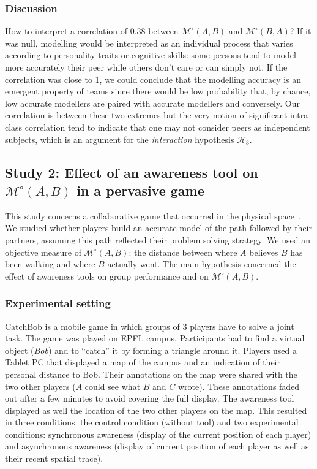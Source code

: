 \documentclass[natbib]{svjour3}
\newcommand{\gModel}[2]{{$\mathcal{M}^{\circ}(#1, #2)$}}
\begin{document}
\subsubsection*{Discussion}

How to interpret a correlation of 0.38 between \gModel{A}{B} and \gModel{B}{A}?
If it was null, modelling would be interpreted as an individual process that
varies according to personality traits or cognitive skills: some persons tend to
model more accurately their peer while others don't care or can simply not. If
the correlation was close to 1, we could conclude that the modelling accuracy is
an emergent property of teams since there would be low probability that, by
chance, low accurate modellers are paired with accurate modellers and
conversely. Our correlation is between these two extremes but the very notion of
significant intra-class correlation tend to indicate that one may not consider
peers as independent subjects, which is an argument for the \emph{interaction}
hypothesis $\mathcal{H}_{3}$. 


\subsection{Study 2: Effect of an awareness tool on \gModel{A}{B}  in a pervasive
game}

This study concerns a collaborative game that occurred in the physical
space~\citep{nova2006underwhelming}. We studied whether players build an accurate
model of the path followed by their partners, assuming this path reflected their
problem solving strategy. We used an objective measure of \gModel{A}{B}: the
distance between where $A$ believes $B$ has been walking and where $B$ actually went.
The main hypothesis concerned the effect of awareness tools on group performance
and on \gModel{A}{B}. 

\subsubsection*{Experimental setting}

{\sc CatchBob} is a mobile game in which groups of 3 players have to solve a
joint task. The game was played on EPFL campus. Participants had to find a
virtual object (\emph{Bob}) and to ``catch'' it by forming a triangle around it.
Players used a Tablet PC that displayed a map of the campus and an indication of
their personal distance to Bob. Their annotations on the map were shared with
the two other players ($A$ could see what $B$ and $C$ wrote). These annotations
faded out after a few minutes to avoid covering the full display. The awareness
tool displayed as well the location of the two other players on the map. This
resulted in three conditions: the control condition (without tool) and two
experimental conditions: synchronous awareness (display of the current position
of each player) and asynchronous awareness (display of current position of each
player as well as their recent spatial trace).
\end{document}
